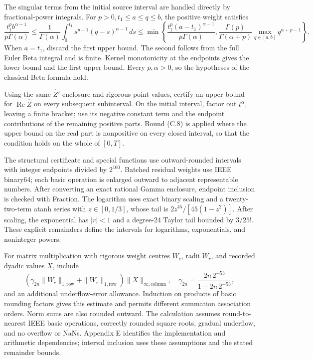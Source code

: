 \documentclass[11pt,a4paper]{article}
\begin{document}
The singular terms from the initial source interval are handled directly by fractional-power integrals. For \(p>0,t_1\le a\le q\le b\), the positive weight satisfies
\begin{equation*}\tag{D.8}
\frac{t_1^pb^{\alpha-1}}{p\Gamma(\alpha)}
\le\frac1{\Gamma(\alpha)}\int_0^{t_1}s^{p-1}(q-s)^{\alpha-1}\,ds
\le\min\left\{
\frac{t_1^p(a-t_1)^{\alpha-1}}{p\Gamma(\alpha)},
\frac{\Gamma(p)}{\Gamma(\alpha+p)}
 \max_{q\in[a,b]}q^{\alpha+p-1}\right\}.
\end{equation*}
When \(a=t_1\), discard the first upper bound. The second follows from the full Euler Beta integral and is finite. Kernel monotonicity at the endpoints gives the lower bound and the first upper bound. Every \(p,\alpha>0\), so the hypotheses of the classical Beta formula hold.

Using the same \(\widehat Z'\) enclosure and rigorous point values, certify an upper bound for \(\operatorname{Re}\widehat Z\) on every subsequent subinterval. On the initial interval, factor out \(t^\alpha\), leaving a finite bracket; use its negative constant term and the endpoint contributions of the remaining positive parts. Bound (C.8) is applied where the upper bound on the real part is nonpositive on every closed interval, so that the condition holds on the whole of \([0,T]\).

The structural certificate and special functions use outward-rounded intervals with integer endpoints divided by \(2^{100}\). Batched residual weights use IEEE binary64; each basic operation is enlarged outward to adjacent representable numbers. After converting an exact rational Gamma enclosure, endpoint inclusion is checked with Fraction. The logarithm uses exact binary scaling and a twenty-two-term atanh series with \(z\in[0,1/3]\), whose tail is \(2z^{45}/[45(1-z^2)]\). After scaling, the exponential has \(|r|<1\) and a degree-24 Taylor tail bounded by \(3/25!\). These explicit remainders define the intervals for logarithms, exponentials, and noninteger powers.

For matrix multiplication with rigorous weight centres \(W_c\), radii \(W_r\), and recorded dyadic values \(X\), include
\begin{equation*}\tag{D.9}
\left(\gamma_{2n}\|W_c\|_{1,\mathrm{row}}+
\|W_r\|_{1,\mathrm{row}}\right)\|X\|_{\infty,\mathrm{column}},
\quad \gamma_{2n}=\frac{2n\,2^{-53}}{1-2n\,2^{-53}},
\end{equation*}
and an additional underflow-error allowance. Induction on products of basic rounding factors gives this estimate and permits different summation association orders. Norm sums are also rounded outward. The calculation assumes round-to-nearest IEEE basic operations, correctly rounded square roots, gradual underflow, and no overflow or NaNs. Appendix E identifies the implementation and arithmetic dependencies; interval inclusion uses these assumptions and the stated remainder bounds.
\end{document}
